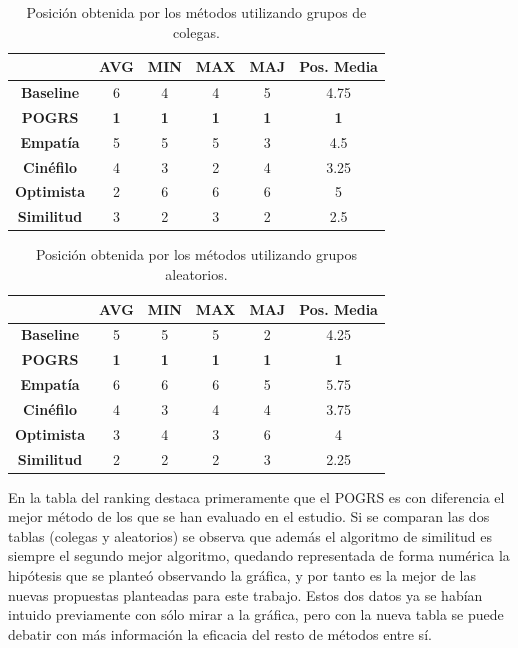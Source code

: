 \begin{table}[H]
	\centering
	\begin{tabular}{ccccc|c}
		\toprule
		{} & \textbf{AVG} & \textbf{MIN} & \textbf{MAX} & \textbf{MAJ} & \textbf{Pos. Media} \\
		\midrule
		\textbf{Baseline} & 6 & 4 & 4 & 5 & 4.75 \\
		\midrule
		\textbf{POGRS} & \textbf{1} & \textbf{1} & \textbf{1} & \textbf{1} & \textbf{1} \\
		\midrule
		\textbf{Empatía} & 5 & 5 & 5 & 3 & 4.5 \\
		\textbf{Cinéfilo} & 4 & 3 & 2 & 4 & 3.25 \\
		\textbf{Optimista} & 2 & 6 & 6 & 6 & 5 \\
		\textbf{Similitud} & 3 & 2 & 3 & 2 & 2.5 \\
		\bottomrule
	\end{tabular}
	\caption{Posición obtenida por los métodos utilizando grupos de colegas.}
	\label{t:posicion-colegas}
\end{table}

\begin{table}[H]
	\centering
		\begin{tabular}{ccccc|c}
			\toprule
			{} & \textbf{AVG} & \textbf{MIN} & \textbf{MAX} & \textbf{MAJ} & \textbf{Pos. Media} \\
			\midrule
			\textbf{Baseline} & 5 & 5 & 5 & 2 & 4.25 \\
			\midrule
			\textbf{POGRS} & \textbf{1} & \textbf{1} & \textbf{1} & \textbf{1} & \textbf{1} \\
			\midrule
			\textbf{Empatía} & 6 & 6 & 6 & 5 & 5.75 \\
			\textbf{Cinéfilo} & 4 & 3 & 4 & 4 & 3.75 \\
			\textbf{Optimista} & 3 & 4 & 3 & 6 & 4 \\
			\textbf{Similitud} & 2 & 2 & 2 & 3 & 2.25 \\
			\bottomrule
	\end{tabular}
	\caption{Posición obtenida por los métodos utilizando grupos aleatorios.}
	\label{t:posicion-aleatorios}
\end{table}

En la tabla del ranking destaca primeramente que el POGRS es con diferencia el mejor método de los que se han evaluado en el estudio. Si se comparan las dos tablas (colegas y aleatorios) se observa que además el algoritmo de similitud es siempre el segundo mejor algoritmo, quedando representada de forma numérica la hipótesis que se planteó observando la gráfica, y por tanto es la mejor de las nuevas propuestas planteadas para este trabajo. Estos dos datos ya se habían intuido previamente con sólo mirar a la gráfica, pero con la nueva tabla se puede debatir con más información la eficacia del resto de métodos entre sí.

